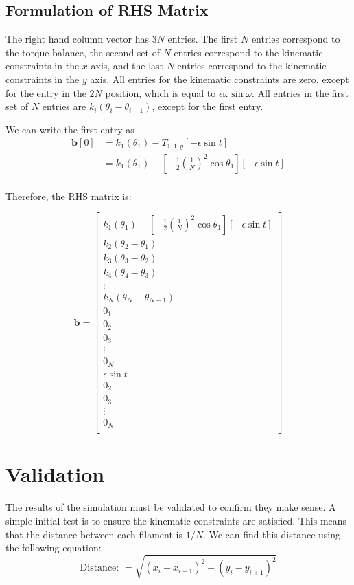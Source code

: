 \documentclass[12pt,letterpaper,titlepage]{article}
\begin{document}
\newpage

\subsection{Formulation of RHS Matrix}
The right hand column vector has $3N$ entries. The first $N$ entries correspond to the torque balance, the second set of $N$ entries correspond to the kinematic constraints in the $x$ axis, and the last $N$ entries correspond to the kinematic constraints in the $y$ axis. All entries for the kinematic constraints are zero, except for the entry in the $2N$ position, which is equal to $\epsilon \omega \sin \omega$. All entries in the first set of $N$ entries are $k_i(\theta_i - \theta_{i-1})$, except for the first entry.

We can write the first entry as
\begin{align*}
\mathbf{b}[0] &= k_1 (\theta_1) - T_{1,1,\dot{y}}[-\epsilon \sin t] \\
&= k_1 (\theta_1) - [-\frac{1}{2}(\frac{1}{N})^2 \cos \theta_1][-\epsilon \sin t] \\
\end{align*}

Therefore, the RHS matrix is:

\[
\mathbf{b} = \begin{bmatrix}
k_1 (\theta_1) - [-\frac{1}{2}(\frac{1}{N})^2 \cos \theta_1][-\epsilon \sin t]\\
k_2 (\theta_2 - \theta_1)\\
k_3 (\theta_3 - \theta_2)\\
k_4 (\theta_4 - \theta_3)\\
\vdots \\
k_N (\theta_N - \theta_{N-1})\\
0_1 \\
0_2 \\
0_3 \\
\vdots \\
0_N \\
\epsilon \sin t \\
0_2 \\
0_3 \\
\vdots \\
0_N \\
\end{bmatrix} 
\]

\section{Validation}
The results of the simulation must be validated to confirm they make sense. A simple initial test is to ensure the kinematic constraints are satisfied. This means that the distance between each filament is $1/N$. We can find this distance using the following equation:
\begin{equation}
\text{Distance: } = \sqrt{(x_i - x_{i+1})^2 + (y_i - y_{i+1})^2}
\end{equation}
\end{document}
